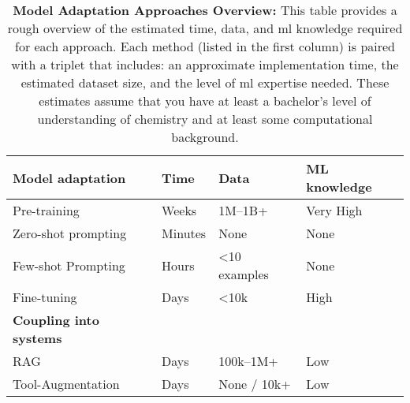 \begin{table}[!ht]
    \centering
    \caption{\textbf{Model Adaptation Approaches Overview:} This table provides a rough overview of the estimated time, data, and \gls{ml} knowledge required for each approach. Each method (listed in the first column) is paired with a triplet that includes: an approximate implementation time, the estimated dataset size, and the level of \gls{ml} expertise needed.  These estimates assume that you have at least a bachelor's level of understanding of chemistry and at least some computational background.}
\begin{tabular}{llll}
\toprule
    \textbf{Model adaptation}  & \textbf{Time}    & \textbf{Data}   & \textbf{ML knowledge}  \\ 
\midrule
Pre-training       & Weeks   & 1M--1B+      & Very High  \\
Zero-shot prompting & Minutes & None        & None          \\
Few-shot Prompting   & Hours   & \textless 10 examples & None          \\
Fine-tuning         & Days    & \textless 10k         & High          \\
\toprule
    \textbf{Coupling into systems} \\ 
\midrule
RAG                & Days    & 100k--1M+    & Low           \\
Tool-Augmentation   & Days    & None / 10k+ & Low           \\
\bottomrule
\end{tabular}
    \label{tab:model_adaptation}
\end{table}
